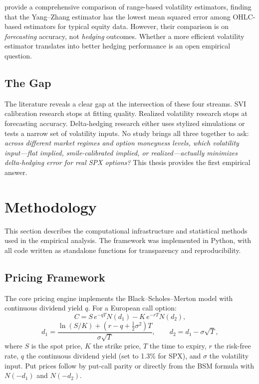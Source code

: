 \documentclass[12pt, letterpaper]{article}
\begin{document}
\citet{Shu2006} provide a comprehensive comparison of range-based volatility estimators, finding that the Yang--Zhang estimator has the lowest mean squared error among OHLC-based estimators for typical equity data. However, their comparison is on \textit{forecasting} accuracy, not \textit{hedging} outcomes. Whether a more efficient volatility estimator translates into better hedging performance is an open empirical question.

\subsection{The Gap}

The literature reveals a clear gap at the intersection of these four streams. SVI calibration research stops at fitting quality. Realized volatility research stops at forecasting accuracy. Delta-hedging research either uses stylized simulations or tests a narrow set of volatility inputs. No study brings all three together to ask: \textit{across different market regimes and option moneyness levels, which volatility input---flat implied, smile-calibrated implied, or realized---actually minimizes delta-hedging error for real SPX options?} This thesis provides the first empirical answer.


\section{Methodology}
\label{sec:methodology}

This section describes the computational infrastructure and statistical methods used in the empirical analysis. The framework was implemented in Python, with all code written as standalone functions for transparency and reproducibility.

\subsection{Pricing Framework}
\label{sec:pricing}

The core pricing engine implements the Black--Scholes--Merton model with continuous dividend yield $q$. For a European call option:
\begin{equation}
    C = S \, e^{-qT} N(d_1) - K \, e^{-rT} N(d_2),
    \label{eq:bs_call}
\end{equation}
\begin{equation}
    d_1 = \frac{\ln(S/K) + (r - q + \tfrac{1}{2}\sigma^2)T}{\sigma\sqrt{T}}, \qquad d_2 = d_1 - \sigma\sqrt{T},
    \label{eq:d1d2}
\end{equation}
where $S$ is the spot price, $K$ the strike price, $T$ the time to expiry, $r$ the risk-free rate, $q$ the continuous dividend yield (set to 1.3\% for SPX), and $\sigma$ the volatility input. Put prices follow by put-call parity or directly from the BSM formula with $N(-d_1)$ and $N(-d_2)$.
\end{document}
